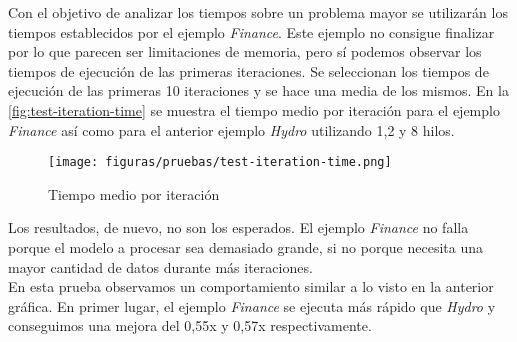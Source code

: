 Con el objetivo de analizar los tiempos sobre un problema mayor se utilizarán los tiempos establecidos por el ejemplo \textit{Finance}. Este ejemplo no consigue finalizar por lo que parecen ser limitaciones de memoria, pero sí podemos observar los tiempos de ejecución de las primeras iteraciones. Se seleccionan los tiempos de ejecución de las primeras 10 iteraciones y se hace una media de los mismos. En la \autoref{fig:test-iteration-time} se muestra el tiempo medio por iteración para el ejemplo \textit{Finance} así como para el anterior ejemplo \textit{Hydro} utilizando 1,2 y 8 hilos.\\

\begin{figure}[H]
    \centerline{\texttt{[image: figuras/pruebas/test-iteration-time.png]}}
    \caption{Tiempo medio por iteración}
    \label{fig:test-iteration-time}
\end{figure}

Los resultados, de nuevo, no son los esperados. El ejemplo \textit{Finance} no falla porque el modelo a procesar sea demasiado grande, si no porque necesita una mayor cantidad de datos durante más iteraciones. \\

En esta prueba observamos un comportamiento similar a lo visto en la anterior gráfica. En primer lugar, el ejemplo \textit{Finance} se ejecuta más rápido que \textit{Hydro} y conseguimos una mejora del 0,55x y 0,57x respectivamente. 